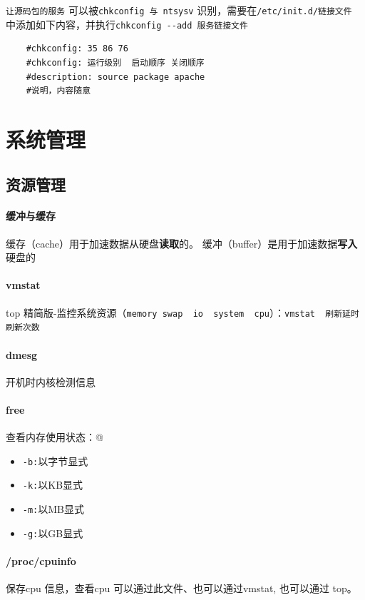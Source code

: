\documentclass[UTF8,a4paper,12pt]{ctexbook}
\begin{document}
				\verb|让源码包的服务| 可以被\verb|chkconfig 与 ntsysv| 识别，需要在\verb|/etc/init.d/链接文件| 中添加如下内容，并执行\verb|chkconfig --add 服务链接文件|
					\begin{lstlisting}
	#chkconfig: 35 86 76
	#chkconfig: 运行级别  启动顺序 关闭顺序
	#description: source package apache
	#说明，内容随意
					\end{lstlisting}
			
	\section{系统管理}
		\subsection{资源管理}
			\paragraph{缓冲与缓存}缓存（cache）用于加速数据从硬盘\textbf{读取}的。 缓冲（buffer）是用于加速数据\textbf{写入}硬盘的
			
			\paragraph{vmstat}top 精简版-监控系统资源（\verb|memory swap  io  system  cpu|）：\verb|vmstat  刷新延时  刷新次数|
			
			\paragraph{dmesg}开机时内核检测信息
	
			\paragraph{free}查看内存使用状态：\verb@free [-b|-k|-m|-g]@
				\begin{itemize}
					\item \verb|-b:|以字节显式
					\item \verb|-k:|以KB显式
					\item \verb|-m:|以MB显式
					\item \verb|-g:|以GB显式
				\end{itemize}
			
			\paragraph{/proc/cpuinfo} 保存cpu 信息，查看cpu 可以通过此文件、也可以通过vmstat, 也可以通过 top。
			
\end{document}
